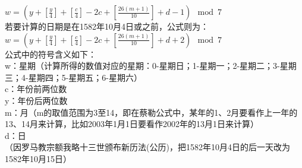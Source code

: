 $w = \left(y+\left[\frac {y}{4}\right] + \left[\frac {c}{4}\right] - 2c + \left[\frac{26(m+1)} {10}\right] + d-1 \right) \mod 7$ \\
若要计算的日期是在1582年10月4日或之前，公式则为：\\
$w = \left(y+\left[\frac {y}{4}\right] + \left[\frac {c}{4}\right] - 2c + \left[\frac{26(m+1)} {10}\right] + d+2 \right) \mod 7$ \\
公式中的符号含义如下：\\
w：星期（计算所得的数值对应的星期：0-星期日；1-星期一；2-星期二；3-星期三；4-星期四；5-星期五；6-星期六）\\
c：年份前两位数\\
y：年份后两位数\\
m：月（m的取值范围为3至14，即在蔡勒公式中，某年的1、2月要看作上一年的13、14月来计算，比如2003年1月1日要看作2002年的13月1日来计算）\\
d：日\\
（因罗马教宗额我略十三世颁布新历法(公历)，把1582年10月4日的后一天改为1582年10月15日）\\
